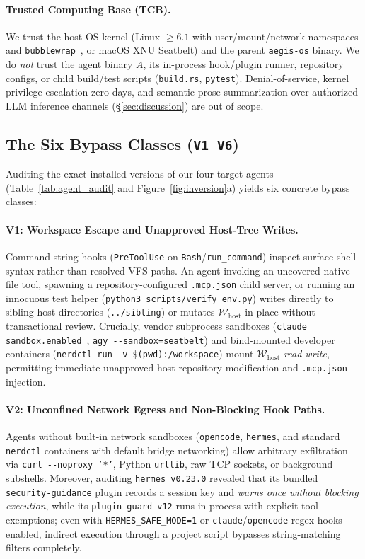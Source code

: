 \documentclass[10pt,twocolumn]{article}
\begin{document}
\paragraph{Trusted Computing Base (TCB).} We trust the host OS kernel (Linux $\ge 6.1$ with user/mount/network namespaces and \texttt{bubblewrap}~\cite{containers2024bubblewrap}, or macOS XNU Seatbelt) and the parent \texttt{aegis-os} binary. We do \emph{not} trust the agent binary $A$, its in-process hook/plugin runner, repository configs, or child build/test scripts (\texttt{build.rs}, \texttt{pytest}). Denial-of-service, kernel privilege-escalation zero-days, and semantic prose summarization over authorized LLM inference channels (\S\ref{sec:discussion}) are out of scope.

\subsection{The Six Bypass Classes (\texttt{V1}--\texttt{V6})}

Auditing the exact installed versions of our four target agents (Table~\ref{tab:agent_audit} and Figure~\ref{fig:inversion}a) yields six concrete bypass classes:

\paragraph{V1: Workspace Escape and Unapproved Host-Tree Writes.}
Command-string hooks (\texttt{PreToolUse} on \texttt{Bash}/\texttt{run\_command}) inspect surface shell syntax rather than resolved VFS paths. An agent invoking an uncovered native file tool, spawning a repository-configured \texttt{.mcp.json} child server, or running an innocuous test helper (\texttt{python3 scripts/verify\_env.py}) writes directly to sibling host directories (\texttt{../sibling}) or mutates $\mathcal{W}_{\text{host}}$ in place without transactional review. Crucially, vendor subprocess sandboxes (\texttt{claude} \texttt{sandbox.enabled}~\cite{anthropic2025srt}, \texttt{agy -\/-sandbox=seatbelt}) and bind-mounted developer containers (\texttt{nerdctl run -v \$(pwd):/workspace}) mount $\mathcal{W}_{\text{host}}$ \emph{read-write}, permitting immediate unapproved host-repository modification and \texttt{.mcp.json} injection.

\paragraph{V2: Unconfined Network Egress and Non-Blocking Hook Paths.}
Agents without built-in network sandboxes (\texttt{opencode}, \texttt{hermes}, and standard \texttt{nerdctl} containers with default bridge networking) allow arbitrary exfiltration via \texttt{curl -\/-noproxy '*'}, Python \texttt{urllib}, raw TCP sockets, or background subshells. Moreover, auditing \texttt{hermes v0.23.0} revealed that its bundled \texttt{security-guidance} plugin records a session key and \emph{warns once without blocking execution}, while its \texttt{plugin-guard-v12} runs in-process with explicit tool exemptions; even with \texttt{HERMES\_SAFE\_MODE=1} or \texttt{claude}/\texttt{opencode} regex hooks enabled, indirect execution through a project script bypasses string-matching filters completely.
\end{document}

